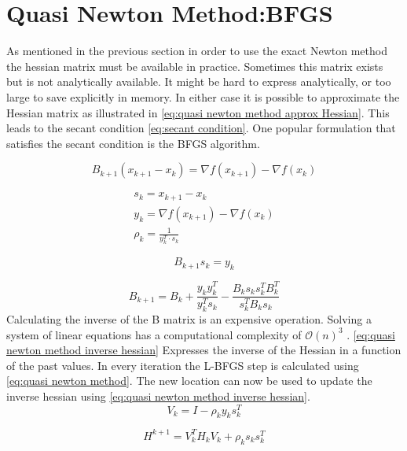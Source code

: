 	\section{Quasi Newton Method:BFGS}
	As mentioned in the previous section in order to use the exact Newton method the hessian matrix must be available in practice. Sometimes this matrix exists but is not analytically available. It might be hard to express analytically, or too large to save explicitly in memory. In either case it is possible to approximate the Hessian matrix as illustrated in \eqref{eq:quasi newton method approx Hessian}.  This leads to the secant condition \eqref{eq:secant condition}. One popular formulation that satisfies the secant condition is the BFGS algorithm.
		
		\begin{equation}
			B_{k+1}(x_{k+1}-x_k) = \nabla f(x_{k+1}) - \nabla f(x_k)
			\label{eq:quasi newton method approx Hessian}	
		\end{equation}
		
		\begin{eqnarray}
			s_k = x_{k+1} - x_{k} \\
			y_k = \nabla f(x_{k+1}) - \nabla f(x_{k}) \\
			\rho_k = \frac{1}{y_k^T \cdot s_k}
		\end{eqnarray}
	
		
		\begin{equation}
			B_{k+1} s_{k} = y_{k}
			\label{eq:secant condition}
		\end{equation}
		
		\begin{equation}
			B_{k+1} = B_{k} + \frac{y_k y_k^T}{ y_k^T s_k} - \frac{B_k s_k s_k^T B_k^T}{s_k^TB_ks_k}
			\label{eq:quasi newton method approx Hessian with past values}
		\end{equation}
	Calculating the inverse of the B matrix is an expensive operation. Solving a system of linear equations has a computational complexity of $\mathcal{O}(n)^3$ . \eqref{eq:quasi newton method inverse hessian} Expresses the inverse of the Hessian in a function of the past values. In every iteration the L-BFGS step is calculated using \eqref{eq:quasi newton method}. The new location can now be used to update the inverse hessian using \eqref{eq:quasi newton method inverse hessian}.
		\begin{equation}
			V_k = I - \rho_ky_ks_k^T
		\end{equation}
	
		\begin{equation}
			H^{k+1} = V_k^TH_kV_k + \rho_ks_ks_k^T
			\label{eq:quasi newton method inverse hessian}	
		\end{equation}
		
